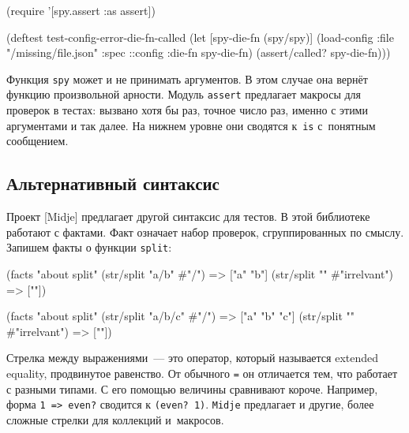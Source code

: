 \begin{english}
  \begin{clojure}
(require '[spy.assert :as assert])

(deftest test-config-error-die-fn-called
  (let [spy-die-fn (spy/spy)]
    (load-config {:file "/missing/file.json"
                  :spec ::config
                  :die-fn spy-die-fn})
    (assert/called? spy-die-fn)))
  \end{clojure}
\end{english}

Функция \verb|spy| может и не принимать аргументов. В этом случае она вернёт
функцию произвольной арности. Модуль \verb|assert| предлагает макросы для
проверок в тестах: вызвано хотя бы раз, точное число раз, именно с этими
аргументами и так далее. На нижнем уровне они сводятся к~\verb|is| с~понятным
сообщением.

\subsection{Альтернативный синтаксис}


Проект [Midje] предлагает другой
синтаксис для тестов. В этой библиотеке работают с фактами. Факт означает набор
проверок, сгруппированных по смыслу. Запишем факты о функции \verb|split|:

\ifnarrow

\begin{english}
  \begin{clojure}
(facts "about split"
 (str/split "a/b" #"/") => ["a" "b"]
 (str/split "" #"irrelvant") => [""])
  \end{clojure}
\end{english}

\else

\begin{english}
  \begin{clojure}
(facts "about split"
 (str/split "a/b/c" #"/") => ["a" "b" "c"]
 (str/split "" #"irrelvant") => [""])
  \end{clojure}
\end{english}

\fi


Стрелка между выражениями~--- это оператор, который называется extended
equality, продвинутое равенство. От обычного \verb|=| он отличается тем, что
работает с разными типами. С его помощью величины сравнивают короче. Например,
форма \verb|1 => even?| сводится к \verb|(even? 1)|. \verb|Midje| предлагает и
другие, более сложные стрелки для коллекций и~макросов.

